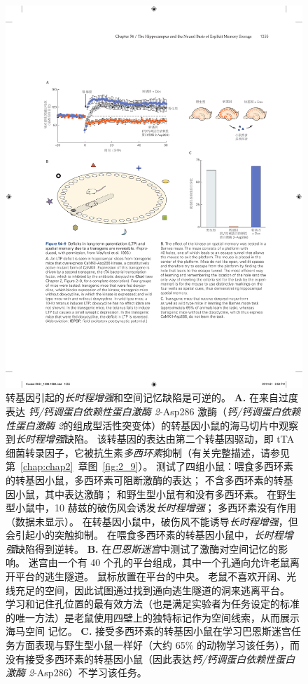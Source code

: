 \begin{figure}[htbp]
	\centering
	\includegraphics[width=1.0\linewidth]{chap54/fig_54_9}
	\caption{转基因引起的\textit{长时程增强}和空间记忆缺陷是可逆的。
		\textbf{A.} 在来自过度表达 \textit{钙/钙调蛋白依赖性蛋白激酶 2}-Asp286 激酶（\textit{钙/钙调蛋白依赖性蛋白激酶 2}的组成型活性突变体）的转基因小鼠的海马切片中观察到\textit{长时程增强}缺陷。
		该转基因的表达由第二个转基因驱动，即 tTA 细菌转录因子，它被抗生素\textit{多西环素}抑制（有关完整描述，请参见第~\ref{chap:chap2}~章图~\ref{fig:2_9}）。
		测试了四组小鼠：喂食多西环素的转基因小鼠，多西环素可阻断激酶的表达；
		不含多西环素的转基因小鼠，其中表达激酶；
		和野生型小鼠有和没有多西环素。
		在野生型小鼠中，10 赫兹的破伤风会诱发\textit{长时程增强}；
		多西环素没有作用（数据未显示）。
		在转基因小鼠中，破伤风不能诱导\textit{长时程增强}，但会引起小的突触抑制。
		在喂食多西环素的转基因小鼠中，\textit{长时程增强}缺陷得到逆转。
		\textbf{B.} 在\textit{巴恩斯迷宫}中测试了激酶对空间记忆的影响。
		迷宫由一个有 40 个孔的平台组成，其中一个孔通向允许老鼠离开平台的逃生隧道。
		鼠标放置在平台的中央。
		老鼠不喜欢开阔、光线充足的空间，因此试图通过找到通向逃生隧道的洞来逃离平台。
		学习和记住孔位置的最有效方法（也是满足实验者为任务设定的标准的唯一方法）是老鼠使用四壁上的独特标记作为空间线索，从而展示海马空间 记忆。
		\textbf{C.} 接受多西环素的转基因小鼠在学习巴恩斯迷宫任务方面表现与野生型小鼠一样好（大约 65\% 的动物学习该任务），而没有接受多西环素的转基因小鼠（因此表达\textit{钙/钙调蛋白依赖性蛋白激酶 2}-Asp286）不学习该任务。}
	\label{fig:54_9}
\end{figure}


